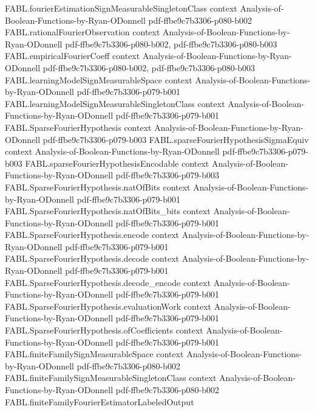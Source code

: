 \begin{theorem}
  {FABL.fourierEstimationSignMeasurableSingletonClass}
  {context}
  {Analysis-of-Boolean-Functions-by-Ryan-ODonnell}
  {pdf-ffbe9c7b3306-p080-b002}
\proofstep
  {FABL.rationalFourierObservation}
  {context}
  {Analysis-of-Boolean-Functions-by-Ryan-ODonnell}
  {pdf-ffbe9c7b3306-p080-b002,
    pdf-ffbe9c7b3306-p080-b003}
\proofstep
  {FABL.empiricalFourierCoeff}
  {context}
  {Analysis-of-Boolean-Functions-by-Ryan-ODonnell}
  {pdf-ffbe9c7b3306-p080-b002,
    pdf-ffbe9c7b3306-p080-b003}
\proofstep
  {FABL.learningModelSignMeasurableSpace}
  {context}
  {Analysis-of-Boolean-Functions-by-Ryan-ODonnell}
  {pdf-ffbe9c7b3306-p079-b001}
\proofstep
  {FABL.learningModelSignMeasurableSingletonClass}
  {context}
  {Analysis-of-Boolean-Functions-by-Ryan-ODonnell}
  {pdf-ffbe9c7b3306-p079-b001}
\proofstep
  {FABL.SparseFourierHypothesis}
  {context}
  {Analysis-of-Boolean-Functions-by-Ryan-ODonnell}
  {pdf-ffbe9c7b3306-p079-b003}
\proofstep
  {FABL.sparseFourierHypothesisSigmaEquiv}
  {context}
  {Analysis-of-Boolean-Functions-by-Ryan-ODonnell}
  {pdf-ffbe9c7b3306-p079-b003}
\proofstep
  {FABL.sparseFourierHypothesisEncodable}
  {context}
  {Analysis-of-Boolean-Functions-by-Ryan-ODonnell}
  {pdf-ffbe9c7b3306-p079-b003}
\proofstep
  {FABL.SparseFourierHypothesis.natOfBits}
  {context}
  {Analysis-of-Boolean-Functions-by-Ryan-ODonnell}
  {pdf-ffbe9c7b3306-p079-b001}
\proofstep
  {FABL.SparseFourierHypothesis.natOfBits_bits}
  {context}
  {Analysis-of-Boolean-Functions-by-Ryan-ODonnell}
  {pdf-ffbe9c7b3306-p079-b001}
\proofstep
  {FABL.SparseFourierHypothesis.encode}
  {context}
  {Analysis-of-Boolean-Functions-by-Ryan-ODonnell}
  {pdf-ffbe9c7b3306-p079-b001}
\proofstep
  {FABL.SparseFourierHypothesis.decode}
  {context}
  {Analysis-of-Boolean-Functions-by-Ryan-ODonnell}
  {pdf-ffbe9c7b3306-p079-b001}
\proofstep
  {FABL.SparseFourierHypothesis.decode_encode}
  {context}
  {Analysis-of-Boolean-Functions-by-Ryan-ODonnell}
  {pdf-ffbe9c7b3306-p079-b001}
\proofstep
  {FABL.SparseFourierHypothesis.evaluationWork}
  {context}
  {Analysis-of-Boolean-Functions-by-Ryan-ODonnell}
  {pdf-ffbe9c7b3306-p079-b001}
\proofstep
  {FABL.SparseFourierHypothesis.ofCoefficients}
  {context}
  {Analysis-of-Boolean-Functions-by-Ryan-ODonnell}
  {pdf-ffbe9c7b3306-p079-b001}
\proofstep
  {FABL.finiteFamilySignMeasurableSpace}
  {context}
  {Analysis-of-Boolean-Functions-by-Ryan-ODonnell}
  {pdf-ffbe9c7b3306-p080-b002}
\proofstep
  {FABL.finiteFamilySignMeasurableSingletonClass}
  {context}
  {Analysis-of-Boolean-Functions-by-Ryan-ODonnell}
  {pdf-ffbe9c7b3306-p080-b002}
\proofstep
  {FABL.finiteFamilyFourierEstimatorLabeledOutput}

\end{theorem}
